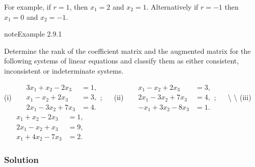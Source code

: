 \documentclass[letterpaper,10pt,english]{jupyterBook}
\begin{document}
\sphinxAtStartPar
For example, if \(r=1\), then \(x_1 = 2\) and \(x_2 = 1\). Alternatively if \(r = -1\) then \(x_1 = 0\) and \(x_2 = -1\).


\label{_pages/2.6_Consistent_systems:rank-example}
\begin{sphinxadmonition}{note}{Example 2.9.1}



\sphinxAtStartPar
Determine the rank of the coefficient matrix and the augmented matrix for the following systems of linear equations and classify them as either consistent, inconsistent or indeterminate systems.

\sphinxAtStartPar
(i)   \(\begin{array}{rl}
    3x_1 + x_2 - 2x_3  \!\!\!\! &= 1, \\
    x_1 - x_2 + 2x_3  \!\!\!\! &= 3, \\
    2x_1 - 3x_2 + 7x_3  \!\!\!\! &= 4.
\end{array}\);  
(ii)   \(\begin{array}{rl}
    x_1 - x_2 + 2x_3  \!\!\!\! &= 3, \\
    2x_1 - 3x_2 + 7x_3  \!\!\!\! &= 4, \\
    -x_1 + 3x_2 - 8x_3  \!\!\!\! &= 1.
\end{array}\);   \textbackslash{} \textbackslash{}
(iii)    \(\begin{array}{rcl}
    x_1 + x_2 - 2x_3  \!\!\!\! &= 1, \\
    2x_1 - x_2 + x_3  \!\!\!\! &= 9, \\
    x_1 + 4x_2 - 7x_3  \!\!\!\! &= 2.
\end{array}\)
\subsubsection*{Solution}


\end{sphinxadmonition}
\end{document}
